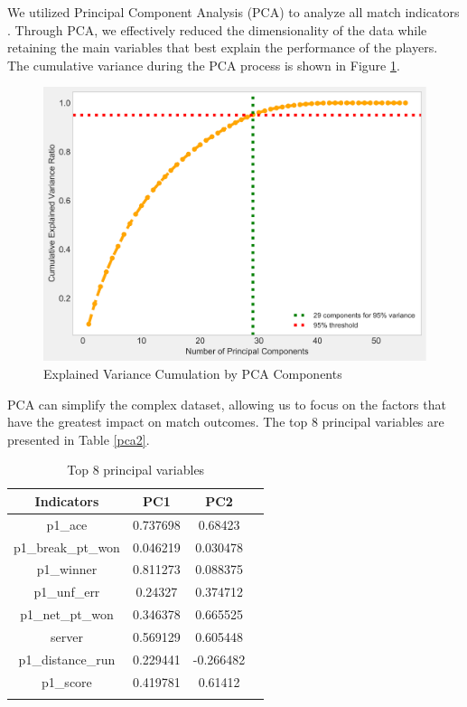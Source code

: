 \documentclass[12pt]{article}%
\begin{document}
We utilized Principal Component Analysis (PCA) to analyze all match indicators \cite{yue2022study}. Through PCA, we effectively reduced the dimensionality of the data while retaining the main variables that best explain the performance of the players. The cumulative variance during the PCA process is shown in Figure \ref{pca1}.
\begin{figure}[H]
	\centering
	\includegraphics[scale=0.5]{figure//pca1.png}
	\caption{Explained Variance Cumulation by PCA Components}
	\label{pca1}
\end{figure}
PCA can simplify the complex dataset, allowing us to focus on the factors that have the greatest impact on match outcomes. The top 8 principal variables are presented in Table \ref{pca2}.

\begin{table}[H]
	\centering
	\caption{Top 8 principal variables}
	\begin{tabular}{cccc}

		\hline
		\hline
		\rowcolor{orange!50}
		Indicators          & PC1      & PC2       &                      \\
		\hline
		\rowcolor{yellow!30}
		p1\_ace            & 0.737698 & 0.68423   &                      \\
		\rowcolor{yellow!30}
		p1\_break\_pt\_won & 0.046219 & 0.030478  &                      \\
		\rowcolor{yellow!30}
		p1\_winner         & 0.811273 & 0.088375  &                      \\
		\rowcolor{yellow!30}
		p1\_unf\_err       & 0.24327  & 0.374712  &                      \\
		\rowcolor{yellow!30}
		p1\_net\_pt\_won   & 0.346378 & 0.665525  &                      \\
		\rowcolor{yellow!30}
		server             & 0.569129 & 0.605448  & \multicolumn{1}{l}{} \\
		\rowcolor{yellow!15}
		p1\_distance\_run  & 0.229441 & -0.266482 & \multicolumn{1}{l}{} \\
		\rowcolor{yellow!15}
		p1\_score          & 0.419781 & 0.61412   & \multicolumn{1}{l}{} \\ \hline \hline
		&          &           & \multicolumn{1}{l}{}
		\label{pca2}
	\end{tabular}
\end{table}
\end{document}
